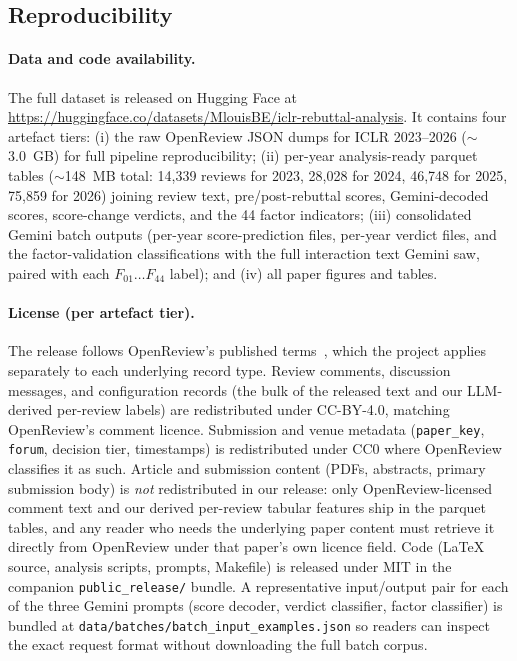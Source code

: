 \documentclass{article}
\newcommand{\code}[1]{\texttt{#1}}
\begin{document}
\subsection{Reproducibility}\label{app:repro}

\paragraph{Data and code availability.}
The full dataset is released on Hugging Face at \url{https://huggingface.co/datasets/MlouisBE/iclr-rebuttal-analysis}. It contains four artefact tiers: (i) the raw OpenReview JSON dumps for ICLR 2023--2026 ($\sim$3.0~GB) for full pipeline reproducibility; (ii) per-year analysis-ready parquet tables ($\sim$148~MB total: 14{,}339 reviews for 2023, 28{,}028 for 2024, 46{,}748 for 2025, 75{,}859 for 2026) joining review text, pre/post-rebuttal scores, Gemini-decoded scores, score-change verdicts, and the 44 factor indicators; (iii) consolidated Gemini batch outputs (per-year score-prediction files, per-year verdict files, and the factor-validation classifications with the full interaction text Gemini saw, paired with each $F_{01}\ldots F_{44}$ label); and (iv) all paper figures and tables.

\paragraph{License (per artefact tier).}
The release follows OpenReview's published terms~\cite{openreview-terms}, which the project applies separately to each underlying record type. Review comments, discussion messages, and configuration records (the bulk of the released text and our LLM-derived per-review labels) are redistributed under CC-BY-4.0, matching OpenReview's comment licence. Submission and venue metadata (\code{paper\_key}, \code{forum}, decision tier, timestamps) is redistributed under CC0 where OpenReview classifies it as such. Article and submission content (PDFs, abstracts, primary submission body) is \emph{not} redistributed in our release: only OpenReview-licensed comment text and our derived per-review tabular features ship in the parquet tables, and any reader who needs the underlying paper content must retrieve it directly from OpenReview under that paper's own licence field. Code (LaTeX source, analysis scripts, prompts, Makefile) is released under MIT in the companion \code{public\_release/} bundle. A representative input/output pair for each of the three Gemini prompts (score decoder, verdict classifier, factor classifier) is bundled at \code{data/batches/batch\_input\_examples.json} so readers can inspect the exact request format without downloading the full batch corpus.
\end{document}
